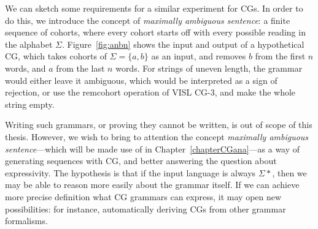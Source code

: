 We can sketch some requirements for a similar experiment for CGs.
In order to do this, we introduce the concept of \emph{maximally ambiguous sentence}: a finite sequence of cohorts, where every cohort starts off with every possible reading in the alphabet $\Sigma$. 
Figure~\ref{fig:anbn} shows the input and output of a hypothetical CG, which takes cohorts
of $\Sigma = \{a, b\}$ as an input, and removes $b$ from the first $n$ words, and $a$ from the last $n$ words. 
For strings of uneven length, the grammar would either leave it ambiguous, which would be interpreted as a sign of rejection, or use the {\sc remcohort} operation of VISL CG-3, and make the whole string empty.

Writing such grammars, or proving they cannot be written, is out of scope of this thesis.
However, we wish to bring to attention the concept \emph{maximally ambiguous sentence}---which 
will be made use of in Chapter~\ref{chapterCGana}---as a way of generating sequences with CG,
and better answering the question about expressivity.
The hypothesis is that if the input language is always $\Sigma{}*$, then we may be able to reason more easily about the grammar itself. 
If we can achieve more precise definition what CG grammars can express, 
it may open new possibilities: for instance, automatically deriving CGs from other grammar formalisms. 









